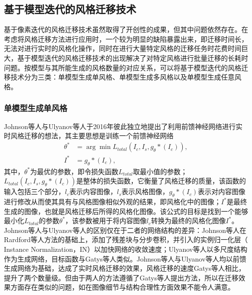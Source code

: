 \subsection{基于模型迭代的风格迁移技术}

基于像素迭代的风格迁移技术虽然取得了开创性的成果，但其中问题依然存在。在考虑将风格迁移方法进行应用时，一个较为明显的缺陷暴露出来，即迁移时间长，无法对进行实时的风格化操作，同时在进行大量特定风格的迁移任务时花费时间巨大，基于模型迭代的风格迁移技术的出现解决了对特定风格进行批量迁移的长耗时问题。按模型与其所能生成的风格数量的对应关系，可以将基于模型迭代的风格迁移技术分为三类：单模型生成单风格、单模型生成多风格以及单模型生成任意风格。

\subsubsection{单模型生成单风格}

Johnson等人\cite{johnsonPerceptualLossesRealTime2016b}与Ulyanov\cite{ulyanovTextureNetworksFeedforward2016b}等人于2016年彼此独立地提出了利用前馈神经网络进行实时风格迁移的想法，其主要思想是训练一个前馈神经网络
\begin{equation}
    \begin{aligned}
        \theta^* &= \arg\min L_{total}\left(I_c,I_s,g_\theta*(I_c)\right),\\
        I^*&=g_\theta*(I_c),
    \end{aligned}
\end{equation}
其中，$\theta^*$为最优的参数，即令损失函数$L_{total}$取最小值的参数；$L_{total}\left(I_c,I_s,g_\theta*(I_c)\right)$是整体的损失函数，它衡量了风格迁移的质量，该函数的输入包括三个部分，$l_c$表示内容图像，$l_s$表示风格图像，$g_\theta*(I_c)$表示对内容图像进行修改从而使其具有与风格图像相似外观的结果，即风格化中的图像；$I^*$是最终生成的图像，也就是风格迁移后所得的风格化图像。该公式的目标是找到一个能够最小化$L_{total}$的参数$\theta^*$，该参数被用于将内容图像$l_c$转换为最终的风格化图像$I^*$。Johnson等人与Ulyanov等人的区别仅在于二者的网络结构的差异：Johnson等人在Rardford等人\cite{radfordUnsupervisedRepresentationLearning2016a}方法的基础上，添加了残差块与分步卷积，并引入的实例归一化层（ Instance Normalization，IN）以加快网络的收敛速度；Ulyanov等人以多尺度结构作为生成网络，目标函数与Gatys等人类似。Johnson等人与Ulyanov等人均以前馈生成网络为基础，达成了实时风格迁移的效果，风格迁移的速度Gatys等人相比，提升了两个数量级。但由于两人的方法遵循了Gatys等人提出方法，所以在迁移效果方面存在类似的问题，如在图像细节与结构合理性方面效果不能令人满意。

